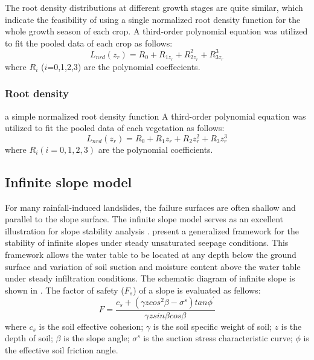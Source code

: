 The root density distributions at different growth stages are quite similar, which indicate the feasibility of using a single normalized root density function for the whole growth season of each crop. A third-order polynomial equation was utilized to fit the pooled data of each crop as follows\cite{WuModeling}:
\begin{equation}L_{nrd}(z_r)=R_0+R_{1z_r}+R_{2z_r}^2+R_{3z_r}^3\end{equation}
where $R_i$ ($i$=0,1,2,3) are the polynomial coeffecients.


\subsubsection{Root density}

a simple normalized root density function
A third-order polynomial equation was utilized to fit the pooled data of each vegetation as follows:
\begin{equation}L_{nrd}(z_r) = R_0 + R_1z_r+R_2z_r^2+R_3z_r^3\end{equation}
where $R_i (i=0,1,2,3) $ are the polynomial coefficients.

\subsection{Infinite slope model}

For many rainfall-induced landslides, the failure surfaces are often shallow and parallel to the slope surface. The infinite slope model serves as an excellent illustration for slope stability analysis \citep{lu2013hill,Cho2002Eva}.
\cite{Lu2008Infinite} present a generalized framework for the stability of infinite slopes under steady unsaturated seepage conditions. This framework allows the water table to be located at any depth below the ground surface and variation of soil suction and moisture content above the water table under steady infiltration conditions. The schematic diagram of infinite slope is shown in . The factor of safety ($F_s$) of a slope is evaluated as fellows:
\begin{equation}F=\frac{c_s+(\gamma z cos^2 \beta - \sigma^s) tan \phi^{'} }{\gamma z sin \beta cos \beta} \end{equation}
where $c_s$ is the soil effective cohesion; $\gamma$ is the soil specific weight of soil; $z$ is the depth of soil; $\beta$ is the slope angle; $\sigma^{s}$ is the suction stress characteristic curve; $\phi$ is the effective soil friction angle.

